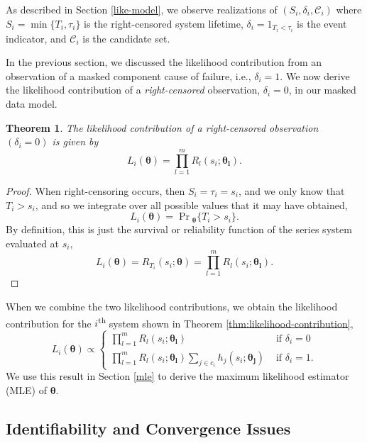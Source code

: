 \documentclass[
]{article}
\theoremstyle{definition}
\theoremstyle{plain}
\newtheorem{theorem}{Theorem}[section]
\theoremstyle{definition}
\theoremstyle{definition}
\theoremstyle{definition}
\theoremstyle{definition}
\theoremstyle{remark}
\begin{document}
As described in Section \ref{like-model}, we observe realizations of
\((S_i,\delta_i,\mathcal{C}_i)\) where \(S_i = \min\{T_i,\tau_i\}\) is the
right-censored system lifetime, \(\delta_i = 1_{T_i < \tau_i}\) is
the event indicator, and \(\mathcal{C}_i\) is the candidate set.

In the previous section, we discussed the likelihood contribution from an
observation of a masked component cause of failure, i.e., \(\delta_i = 1\).
We now derive the likelihood contribution of a \emph{right-censored} observation,
\(\delta_i = 0\), in our masked data model.

\begin{theorem}
\protect\hypertarget{thm:joint_s_d_c}{}\label{thm:joint_s_d_c}The likelihood contribution of a right-censored observation \((\delta_i = 0)\)
is given by
\begin{equation}
L_i(\boldsymbol{\theta}) = \prod_{l=1}^m R_l(s_i;\boldsymbol{\theta_l}).
\end{equation}
\end{theorem}

\begin{proof}
When right-censoring occurs, then \(S_i = \tau_i = s_i\), and we only know that
\(T_i > s_i\), and so we integrate over all possible values that it may have
obtained,
\[
L_i(\boldsymbol{\theta}) = \Pr\!{}_{\boldsymbol{\theta}}\{T_i > s_i\}.
\]
By definition, this is just the survival or reliability function of the series system
evaluated at \(s_i\),
\[
L_i(\boldsymbol{\theta}) = R_{T_i}(s_i;\boldsymbol{\theta}) = \prod_{l=1}^m R_l(s_i;\boldsymbol{\theta_l}).
\]
\end{proof}

When we combine the two likelihood contributions, we obtain the likelihood
contribution for the \(i\)\textsuperscript{th} system shown in Theorem
\ref{thm:likelihood-contribution},
\[
L_i(\boldsymbol{\theta}) \propto
\begin{cases}
    \prod_{l=1}^m R_l(s_i;\boldsymbol{\theta_l})         &\text{ if } \delta_i = 0\\
    \prod_{l=1}^m R_l(s_i;\boldsymbol{\theta_l})
        \sum_{j\in c_i} h_j(s_i;\boldsymbol{\theta_j})   &\text{ if } \delta_i = 1.
\end{cases}
\]
We use this result in Section \ref{mle} to derive the maximum likelihood
estimator (MLE) of \(\boldsymbol{\theta}\).

\hypertarget{identifiability}{%
\subsection{Identifiability and Convergence Issues}\label{identifiability}}
\end{document}
